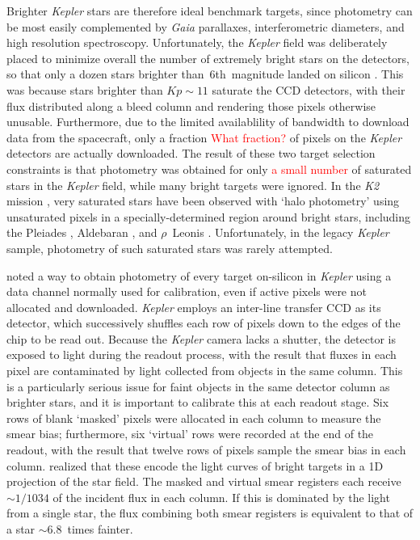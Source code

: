 \documentclass[a4paper,fleqn,usenatbib]{mnras}
\newcommand{\kepler}{\emph{Kepler}\xspace}
\newcommand{\ktwo}{\emph{K2}\xspace}
\newcommand{\gaia}{\emph{Gaia}\xspace}
\begin{document}
Brighter \kepler stars are therefore ideal benchmark targets, since photometry can be most easily complemented by \gaia parallaxes, interferometric diameters, and high resolution spectroscopy.  
Unfortunately, the \kepler field was deliberately placed to minimize overall the number of extremely bright stars on the detectors, so that only a dozen stars brighter than~6th~magnitude landed on silicon \citep{2010ApJ...713L..79K}. This was because stars brighter than $Kp \sim 11$ saturate the CCD detectors, with their flux distributed along a bleed column and rendering those pixels otherwise unusable. Furthermore, due to the limited availablility of bandwidth to download data from the spacecraft, only a fraction \textcolor{red}{What fraction?} of pixels on the \kepler detectors are actually downloaded. The result of these two target selection constraints is that photometry was obtained for only \textcolor{red}{a small number} of saturated stars in the \kepler field, while many bright targets were ignored. In the \ktwo mission \citep{k2early}, very saturated stars have been observed with `halo photometry' using unsaturated pixels in a specially-determined region around bright stars, including the Pleiades \citep{halo}, Aldebaran \citep{aldebaran}, and $\rho$~Leonis \citep{rholeo}. Unfortunately, in the legacy \kepler sample, photometry of such saturated stars was rarely attempted.

\citet{orig_smear} noted a way to obtain photometry of every target on-silicon in \kepler using a data channel normally used for calibration, even if active pixels were not allocated and downloaded. \kepler employs an inter-line transfer CCD as its detector, which successively shuffles each row of pixels down to the edges of the chip to be read out. Because the \kepler camera lacks a shutter, the detector is exposed to light during the readout process, with the result that fluxes in each pixel are contaminated by light collected from objects in the same column. This is a particularly serious issue for faint objects in the same detector column as brighter stars, and it is important to calibrate this at each readout stage. Six rows of blank `masked' pixels were allocated in each column to measure the smear bias; furthermore, six `virtual' rows were recorded at the end of the readout, with the result that twelve rows of pixels sample the smear bias in each column. \citet{orig_smear} realized that these encode the light curves of bright targets in a 1D projection of the star field. The masked and virtual smear registers each receive $\sim 1/1034$ of the incident flux in each column. If this is dominated by the light from a single star, the flux combining both smear registers is equivalent to that of a star $\sim 6.8$~times fainter. 
\end{document}

